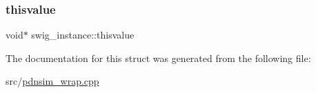 \subsubsection{\texorpdfstring{thisvalue}{thisvalue}}
{\footnotesize\ttfamily void$\ast$ swig\+\_\+instance\+::thisvalue}



The documentation for this struct was generated from the following file\+:\begin{DoxyCompactItemize}
\item 
src/\hyperlink{pdnsim__wrap_8cpp}{pdnsim\+\_\+wrap.\+cpp}\end{DoxyCompactItemize}
